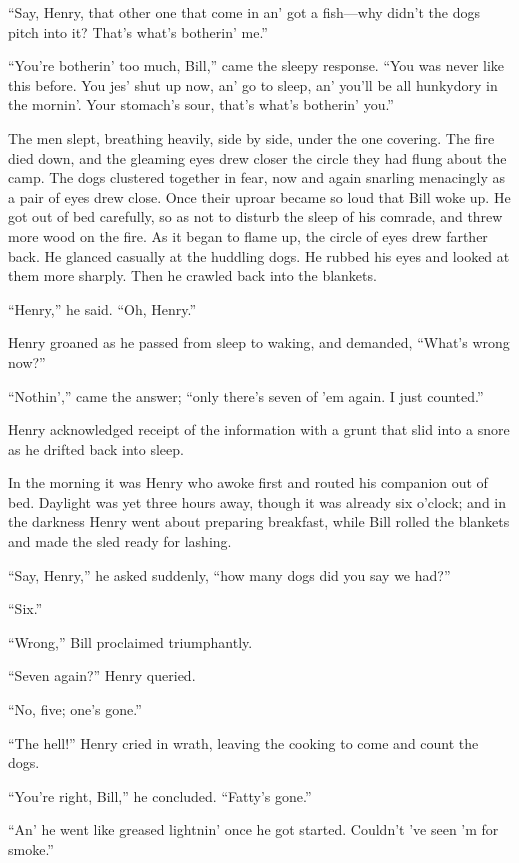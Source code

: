 \documentclass[10pt]{book}
\begin{document}
“Say, Henry, that other one that come in an’ got a fish—why didn’t the
dogs pitch into it? That’s what’s botherin’ me.”

“You’re botherin’ too much, Bill,” came the sleepy response. “You was
never like this before. You jes’ shut up now, an’ go to sleep, an’
you’ll be all hunkydory in the mornin’. Your stomach’s sour, that’s
what’s botherin’ you.”

The men slept, breathing heavily, side by side, under the one covering.
The fire died down, and the gleaming eyes drew closer the circle they
had flung about the camp. The dogs clustered together in fear, now and
again snarling menacingly as a pair of eyes drew close. Once their
uproar became so loud that Bill woke up. He got out of bed carefully,
so as not to disturb the sleep of his comrade, and threw more wood on
the fire. As it began to flame up, the circle of eyes drew farther
back. He glanced casually at the huddling dogs. He rubbed his eyes and
looked at them more sharply. Then he crawled back into the blankets.

“Henry,” he said. “Oh, Henry.”

Henry groaned as he passed from sleep to waking, and demanded, “What’s
wrong now?”

“Nothin’,” came the answer; “only there’s seven of ’em again. I just
counted.”

Henry acknowledged receipt of the information with a grunt that slid
into a snore as he drifted back into sleep.

In the morning it was Henry who awoke first and routed his companion
out of bed. Daylight was yet three hours away, though it was already
six o’clock; and in the darkness Henry went about preparing breakfast,
while Bill rolled the blankets and made the sled ready for lashing.

“Say, Henry,” he asked suddenly, “how many dogs did you say we had?”

“Six.”

“Wrong,” Bill proclaimed triumphantly.

“Seven again?” Henry queried.

“No, five; one’s gone.”

“The hell!” Henry cried in wrath, leaving the cooking to come and count
the dogs.

“You’re right, Bill,” he concluded. “Fatty’s gone.”

“An’ he went like greased lightnin’ once he got started. Couldn’t ’ve
seen ’m for smoke.”
\end{document}
